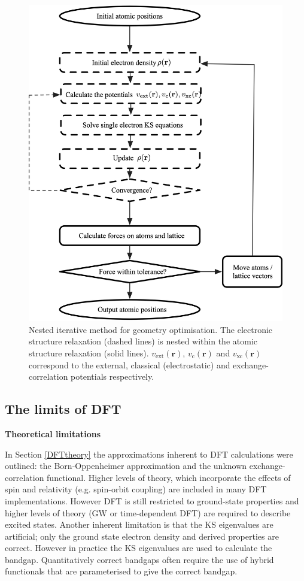 \begin{figure}[h]
\centering
  \includegraphics[width=0.7\columnwidth]{figures/ch3/scf.png}
  \caption[Nested iterative method for geometry optimisation]{Nested iterative method for geometry optimisation. The electronic structure relaxation (dashed lines) is nested within the atomic structure relaxation (solid lines). $v_\textrm{ext}(\textbf{r})$, $v_\textrm{c}(\textbf{r})$ and $v_\textrm{xc}(\textbf{r})$ correspond to the external, classical (electrostatic) and exchange-correlation potentials respectively.} 
  \label{SCF}
\end{figure}

\subsection{The limits of DFT}


\textbf{Theoretical limitations} 

In Section \ref{DFTtheory} the approximations inherent to DFT calculations were outlined: the Born-Oppenheimer approximation and the unknown exchange-correlation functional. Higher levels of theory, which incorporate the effects of spin and relativity (e.g. spin-orbit coupling) are included in many DFT implementations. However DFT is still restricted to ground-state properties and higher levels of theory (GW or time-dependent DFT) are required to describe excited states. Another inherent limitation is that the KS eigenvalues are artificial; only the ground state electron density and derived properties are correct. However in practice the KS eigenvalues are used to calculate the bandgap. Quantitatively correct bandgaps often require the use of hybrid functionals that are parameterised to give the correct bandgap.

